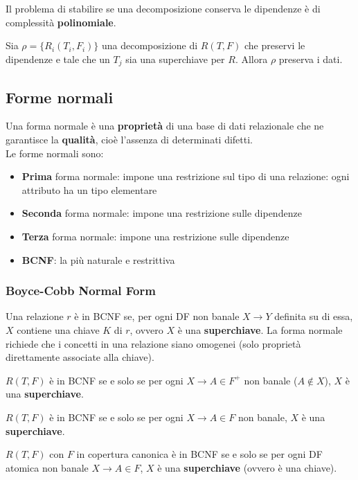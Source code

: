 \begin{note}
	Il problema di stabilire se una decomposizione conserva le dipendenze è di complessità \textbf{polinomiale}.
\end{note}

\begin{theorem}
	Sia $\rho = \{R_i(T_i, F_i)\}$ una decomposizione di $R(T, F)$ che preservi le dipendenze e tale che un $T_j$ sia una superchiave per $R$. Allora $\rho$ preserva i dati.
\end{theorem}

\subsection{Forme normali}
Una forma normale è una \textbf{proprietà} di una base di dati relazionale che ne garantisce la \textbf{qualità}, cioè l'assenza di determinati difetti.\\
Le forme normali sono:
\begin{itemize}
	\item \textbf{Prima} forma normale: impone una restrizione sul tipo di una relazione: ogni attributo ha un tipo elementare
	\item \textbf{Seconda} forma normale: impone una restrizione sulle dipendenze
	\item \textbf{Terza} forma normale: impone una restrizione sulle dipendenze
	\item \textbf{BCNF}: la più naturale e restrittiva
\end{itemize}

\subsubsection{Boyce-Cobb Normal Form}
Una relazione $r$ è in BCNF se, per ogni DF non banale $X \to Y$ definita su di essa, $X$ contiene una chiave $K$ di $r$, ovvero $X$ è una \textbf{superchiave}. La forma normale richiede che i concetti in una relazione siano omogenei (solo proprietà direttamente associate alla chiave).

\begin{definition}[BCNF]
	$R(T, F)$ è in BCNF se e solo se per ogni $X \to A \in F^+$ non banale ($A \notin X$), $X$ è una \textbf{superchiave}.
\end{definition}
\begin{theorem}
	$R(T, F)$ è in BCNF se e solo se per ogni $X \to A \in F$ non banale, $X$ è una \textbf{superchiave}.
\end{theorem}
\begin{corollaries}
	$R(T, F)$ con $F$ in copertura canonica è in BCNF se e solo se per ogni DF atomica non banale $X \to A\in F$, $X$ è una \textbf{superchiave} (ovvero è una chiave).
\end{corollaries}

